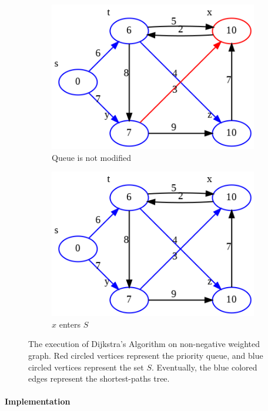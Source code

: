 \documentclass[../main.tex]{subfiles}
\begin{document}
\begin{figure}[!ht]
\begin{subfigure}{.32\textwidth}
    \includegraphics[width=0.99\columnwidth]{fig/dijkstra_4.png}
    \caption{Queue is not modified}
    \end{subfigure}
    
        \begin{subfigure}{.32\textwidth}
    \includegraphics[width=0.99\columnwidth]{fig/dijkstra_4.5.png}
    \caption{$x$ enters $S$}
    \end{subfigure}
    \caption{The execution of Dijkstra's Algorithm on non-negative weighted graph. Red circled vertices represent the priority queue, and blue circled vertices represent the set $S$. Eventually, the blue colored edges represent the shortest-paths tree.}
    \label{fig:dijikstra}
\end{figure}
\paragraph{Implementation}
\end{document}
